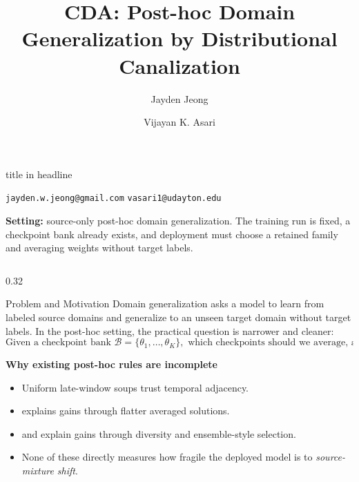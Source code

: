 \documentclass[final]{beamer}
\title{CDA: Post-hoc Domain Generalization by Distributional Canalization}
\author{Jayden Jeong \and Vijayan K. Asari}
\institute{MSTC, Paul Laurence Dunbar High School \and University of Dayton Vision Lab}
\newcommand{\methodsc}[1]{\ifmmode\text{{\rmfamily\textsc{#1}}}\else{\rmfamily\textsc{#1}}\fi}
\newcommand{\swad}{\methodsc{SWAD}}
\newcommand{\diwa}{\methodsc{DiWA}}
\newcommand{\eoa}{\methodsc{EoA}}
\begin{document}
\begin{frame}[t]
\begin{beamercolorbox}[wd=\paperwidth,sep=1.2cm,leftskip=1.0cm,rightskip=1.0cm]{title in headline}
    {\inserttitle\par}
    \vspace{0.35cm}
    {\insertauthor\par}
    \vspace{0.15cm}
    {\insertinstitute\par}
    \vspace{0.12cm}
    {\normalsize \texttt{jayden.w.jeong@gmail.com} \hfill \texttt{vasari1@udayton.edu}\par}
    \vspace{0.18cm}
    {\normalsize \textbf{Setting:} source-only post-hoc domain generalization. The training run is fixed, a checkpoint bank already exists, and deployment must choose a retained family and averaging weights without target labels.}
\end{beamercolorbox}

\vspace{0.55cm}

\begin{columns}[t,totalwidth=\textwidth]

\begin{column}{0.32\textwidth}

\begin{block}{Problem and Motivation}
\justifying
Domain generalization asks a model to learn from labeled source domains and generalize to an unseen target domain without target labels. In the post-hoc setting, the practical question is narrower and cleaner:
\[
\text{Given a checkpoint bank } \mathcal{B}=\{\theta_1,\ldots,\theta_K\},
\text{ which checkpoints should we average, and why?}
\]

\textbf{Why existing post-hoc rules are incomplete}
\begin{itemize}
\item Uniform late-window soups trust temporal adjacency.
\item \swad{} explains gains through flatter averaged solutions.
\item \diwa{} and \eoa{} explain gains through diversity and ensemble-style selection.
\item None of these directly measures how fragile the deployed model is to \emph{source-mixture shift}.
\end{itemize}


\end{block}
\end{column}
\end{columns}
\end{frame}
\end{document}
